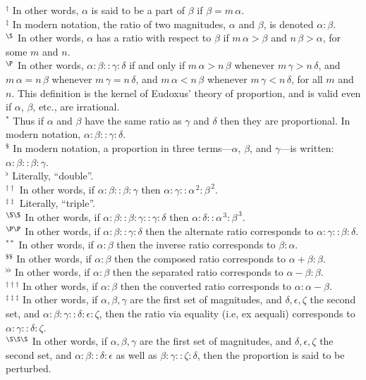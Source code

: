 {\footnotesize \noindent$^\dag$ In other words, $\alpha$ is said to be a part of $\beta$ if $\beta = m\,\alpha$.\\[0.5ex]
$^\ddag$ In modern notation, the ratio of two 
magnitudes, $\alpha$ and $\beta$, is denoted $\alpha:\beta$.\\[0.5ex]
$^\S$ In other words, $\alpha$ has a ratio with respect to $\beta$ if $m\,\alpha >\beta$
and $n\,\beta>\alpha$, for some $m$ and $n$.\\[0.5ex]
$^\P$ In other words, $\alpha:\beta::\gamma:\delta$ if and only if $m\,\alpha>n\,\beta$ whenever $m\,\gamma>n\,\delta$, and $m\,\alpha=n\,\beta$
whenever $m\,\gamma=n\,\delta$, and $m\,\alpha< n\,\beta$ whenever $m\,\gamma<
n\,\delta$, for all $m$ and $n$. This definition  is the kernel of Eudoxus' theory of proportion, and is valid even if $\alpha$,  $\beta$, {\rm etc.}, are irrational.\\[0.5ex]
$^\ast$ Thus if $\alpha$ and $\beta$ have the same ratio
as $\gamma$ and $\delta$ then they are proportional. In modern notation,
$\alpha:\beta::\gamma:\delta$.\\[0.5ex]
$^{\$}$ In modern notation, a proportion in three terms---$\alpha$, $\beta$, and $\gamma$---is written: $\alpha:\beta::\beta:\gamma$.\\
$^{\flat}$ Literally, ``double''.\\[0.5ex]
$^{\dag\dag}$ In other words, if $\alpha:\beta::\beta:\gamma$ then $\alpha:\gamma::\alpha^{\,2}:\beta^{\,2}$.\\[0.5ex]
$^{\ddag\ddag}$ Literally, ``triple''.\\[0.5ex]
$^{\S\S}$ In other words, if $\alpha:\beta::\beta:\gamma::\gamma:\delta$ then $\alpha:\delta::\alpha^{\,3}:\beta^{\,3}$.\\[0.5ex]
$^{\P\P}$ In other words, if $\alpha:\beta::\gamma:\delta$ then the alternate ratio
corresponds to  $\alpha:\gamma::\beta:\delta$.\\[0.5ex]
$^{\ast\ast}$ In other words, if  $\alpha:\beta$ then the inverse ratio
corresponds to $\beta:\alpha$.\\[0.5ex]
$^{\$\$}$ In other words, if
 $\alpha:\beta$ then the composed ratio
 corresponds to  $\alpha+\beta:\beta$.\\[0.5ex]
 $^{\flat\flat}$ In other words, if
 $\alpha:\beta$ then the separated ratio
 corresponds to  $\alpha-\beta:\beta$.\\[0.5ex]
 $^{\dag\dag\dag}$ In other words, if
 $\alpha:\beta$ then the converted ratio
 corresponds to  $\alpha:\alpha-\beta$.\\[0.5ex]
 $^{\ddag\ddag\ddag}$ In other words, if $\alpha, \beta, \gamma$ are the first set of
 magnitudes, and $\delta, \epsilon, \zeta$ the second set, and $\alpha:
 \beta:\gamma::\delta:\epsilon:\zeta$,  then
 the ratio via equality (i.e, ex aequali) corresponds to
 $\alpha:\gamma::\delta:\zeta$.\\[0.5ex]
 $^{\S\S\S}$ In other words, if $\alpha, \beta, \gamma$ are the first set of
 magnitudes, and $\delta, \epsilon, \zeta$ the second set, and $\alpha:\beta::\delta:\epsilon$ as well as $\beta:\gamma::\zeta:\delta$, then
 the proportion is said to be perturbed.}


